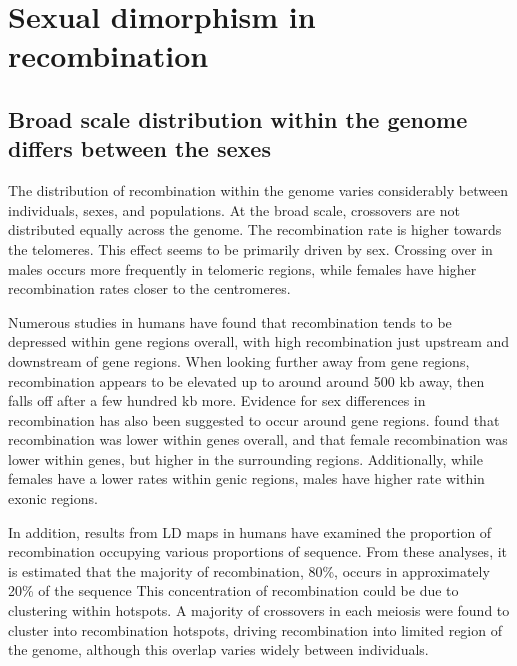 \section{Sexual dimorphism in recombination}

\subsection{Broad scale distribution within the genome differs between the sexes}

The distribution of recombination within the genome varies considerably between individuals, sexes, and populations.
At the broad scale, crossovers are not distributed equally across the genome.
The recombination rate is higher towards the telomeres\cite{Broman1998,Mcvean2004,hapmap2007}.
This effect seems to be primarily driven by sex.
Crossing over in males occurs more frequently in telomeric regions, while females have higher recombination rates closer to the centromeres\cite{Kong2002,Coop2008,Kong2010}.

Numerous studies in humans have found that recombination tends to be depressed within gene regions overall, with high recombination just upstream and downstream of gene regions\cite{Mcvean2004,Myers2005,hapmap2007,Spencer2006,Kong2010}.
When looking further away from gene regions, recombination appears to be elevated up to around around 500 kb away, then falls off after a few hundred kb more.
Evidence for sex differences in recombination has also been suggested to occur around gene regions.
\citet{Kong2010} found that recombination was lower within genes overall, and that
female recombination was lower within genes, but higher in the surrounding regions.
Additionally, while females have a lower rates within genic regions, males have higher rate within exonic regions\cite{Kong2010}.

In addition, results from LD maps in humans have examined the proportion of recombination occupying various proportions of sequence.
From these analyses, it is estimated that the majority of recombination, 80\%, occurs in approximately 20\% of the sequence\cite{Mcvean2004,Myers2005,hapmap2007}
This concentration of recombination could be due to clustering within hotspots.
A majority of crossovers in each meiosis were found to cluster into recombination hotspots, driving recombination into limited region of the genome\cite{Coop2008}, although this overlap varies widely between individuals.


